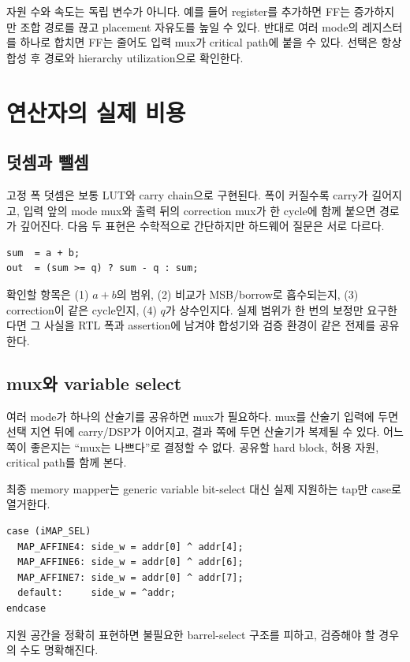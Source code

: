 자원 수와 속도는 독립 변수가 아니다. 예를 들어 register를 추가하면 FF는
증가하지만 조합 경로를 끊고 placement 자유도를 높일 수 있다. 반대로 여러
mode의 레지스터를 하나로 합치면 FF는 줄어도 입력 mux가 critical path에 붙을
수 있다. 선택은 항상 합성 후 경로와 hierarchy utilization으로 확인한다.

\section{연산자의 실제 비용}

\subsection{덧셈과 뺄셈}

고정 폭 덧셈은 보통 LUT와 carry chain으로 구현된다. 폭이 커질수록 carry가
길어지고, 입력 앞의 mode mux와 출력 뒤의 correction mux가 한 cycle에 함께
붙으면 경로가 깊어진다. 다음 두 표현은 수학적으로 간단하지만 하드웨어 질문은
서로 다르다.

\begin{lstlisting}
sum  = a + b;
out  = (sum >= q) ? sum - q : sum;
\end{lstlisting}

확인할 항목은 (1) $a+b$의 범위, (2) 비교가 MSB/borrow로 흡수되는지,
(3) correction이 같은 cycle인지, (4) $q$가 상수인지다. 실제 범위가 한 번의
보정만 요구한다면 그 사실을 RTL 폭과 assertion에 남겨야 합성기와 검증 환경이
같은 전제를 공유한다.

\subsection{mux와 variable select}

여러 mode가 하나의 산술기를 공유하면 mux가 필요하다. mux를 산술기 입력에
두면 선택 지연 뒤에 carry/DSP가 이어지고, 결과 쪽에 두면 산술기가 복제될 수
있다. 어느 쪽이 좋은지는 ``mux는 나쁘다''로 결정할 수 없다. 공유할 hard block,
허용 자원, critical path를 함께 본다.

최종 memory mapper는 generic variable bit-select 대신 실제 지원하는 tap만
case로 열거한다.

\begin{lstlisting}
case (iMAP_SEL)
  MAP_AFFINE4: side_w = addr[0] ^ addr[4];
  MAP_AFFINE6: side_w = addr[0] ^ addr[6];
  MAP_AFFINE7: side_w = addr[0] ^ addr[7];
  default:     side_w = ^addr;
endcase
\end{lstlisting}

지원 공간을 정확히 표현하면 불필요한 barrel-select 구조를 피하고, 검증해야 할
경우의 수도 명확해진다.

